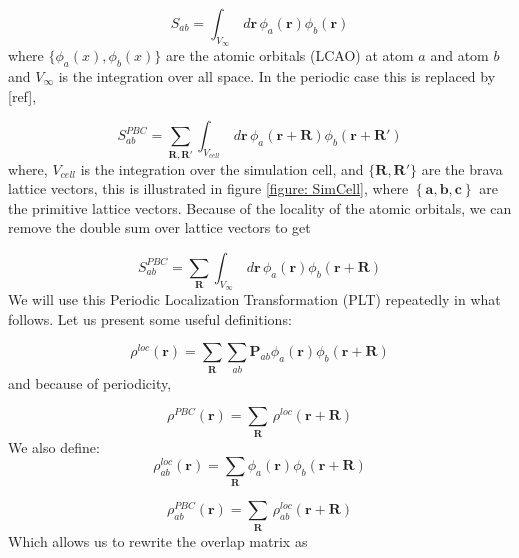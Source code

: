 \commentoutA{\documentclass[prb,aps,twocolumn,showpacs,twocolumngrid,superbib]{revtex4}}
\begin{document}
\begin{equation}
\label{Sab_norm}
S_{ab}=\int _{V_{\infty }}\, d{\mathbf{r}}\, \phi _{a}({\mathbf{r}})\phi _{b}({\mathbf{r}})
\end{equation}
 where \( \{\phi _{a}(x),\phi _{b}(x)\} \) are the atomic orbitals
(LCAO) at atom \( a \) and atom \( b \) and \( V_{\infty } \) is
the integration over all space. In the periodic case this is replaced
by {[}ref{]},

\begin{equation}
\label{Sab_pbc1}
S_{ab}^{PBC}=\sum _{\mathbf{R},\mathbf{R}'}\int _{V_{cell}}\, d{\mathbf{r}}\, \phi _{a}({\mathbf{r}+\mathbf{R}})\phi _{b}({\mathbf{r}+\mathbf{R}'})
\end{equation}
where, \( V_{cell} \) is the integration over the simulation cell,
and \( \{\mathbf{R},\mathbf{R}'\} \) are the brava lattice vectors,
this is illustrated in figure \ref{figure: SimCell}, where \( \left\{ {\mathbf{a},\mathbf{b},\mathbf{c}}\right\}  \)
are the primitive lattice vectors. Because of the locality of the
atomic orbitals, we can remove the double sum over lattice vectors
to get

\begin{equation}
\label{Sab_pbc2}
S_{ab}^{PBC}=\sum _{\mathbf{R}}\int _{V_{\infty }}\, d{\mathbf{r}}\, \phi _{a}({\mathbf{r}})\phi _{b}({\mathbf{r}+\mathbf{R}})
\end{equation}
We will use this Periodic Localization Transformation (PLT) repeatedly
in what follows. Let us present some useful definitions:

\begin{equation}
\label{rho_loc}
\rho ^{loc}({\mathbf{r}})=\sum _{\mathbf{R}}\sum _{ab}{\mathbf{P}}_{ab}\phi _{a}({\mathbf{r}})\phi _{b}({\mathbf{r}+\mathbf{R}})
\end{equation}
and because of periodicity,

\begin{equation}
\label{rho_pbc}
\rho ^{PBC}({\mathbf{r}})=\sum _{\mathbf{R}}\, \rho ^{loc}({\mathbf{r}+\mathbf{R}})
\end{equation}
We also define:\begin{equation}
\label{rho_loc_ab}
\rho _{ab}^{loc}({\mathbf{r}})=\sum _{\mathbf{R}}\phi _{a}({\mathbf{r}})\phi _{b}({\mathbf{r}+\mathbf{R}})
\end{equation}


\begin{equation}
\label{rho_pbc_ab}
\rho _{ab}^{PBC}({\mathbf{r}})=\sum _{\mathbf{R}}\, \rho _{ab}^{loc}({\mathbf{r}+\mathbf{R}})
\end{equation}
Which allows us to rewrite the overlap matrix as
\end{document}
